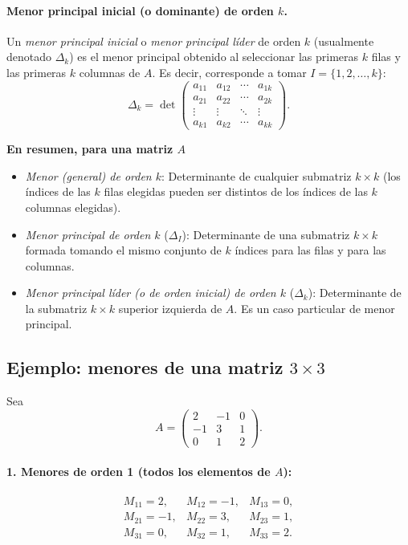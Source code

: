 \documentclass{article}
\begin{document}
\paragraph{Menor principal inicial (o dominante) de orden $k$.}
Un \emph{menor principal inicial} o  \emph{menor principal líder} de orden $k$ (usualmente denotado $\Delta_k$) es el menor principal obtenido al seleccionar las primeras $k$ filas y las primeras $k$ columnas de $A$. Es decir, corresponde a tomar $I = \{1, 2, \dots, k\}$:
\[
\Delta_k = \det\begin{pmatrix}
a_{11} & a_{12} & \cdots & a_{1k}\\
a_{21} & a_{22} & \cdots & a_{2k}\\
\vdots & \vdots & \ddots & \vdots\\
a_{k1} & a_{k2} & \cdots & a_{kk}
\end{pmatrix}.
\]

\medskip

\noindent\textbf{En resumen, para una matriz $A$}
\begin{itemize}
  \item \color{teal}\emph{Menor (general) de orden $k$}: Determinante de cualquier submatriz $k \times k$ (los índices de las $k$ filas elegidas pueden ser distintos de los índices de las $k$ columnas elegidas).
  \item \emph{Menor principal de orden $k$} ($\Delta_I$): Determinante de una submatriz $k \times k$ formada tomando el mismo conjunto de $k$ índices para las filas y para las columnas.
  \item \emph{Menor principal líder (o de orden inicial) de orden $k$} ($\Delta_k$): Determinante de la submatriz $k \times k$ superior izquierda de $A$. Es un caso particular de menor principal.
\end{itemize}

\subsection*{Ejemplo: menores de una matriz $3\times3$}

Sea
\[
A = \begin{pmatrix}
2 & -1 & 0\\[4pt]
-1 & 3 & 1\\[4pt]
0 & 1 & 2
\end{pmatrix}.
\]

\paragraph*{1. Menores de orden 1 (todos los elementos de \(A\)):}
\[
\begin{array}{ccc}
M_{11}=2, & M_{12}=-1, & M_{13}=0,\\[4pt]
M_{21}=-1,& M_{22}=3,  & M_{23}=1,\\[4pt]
M_{31}=0, & M_{32}=1,  & M_{33}=2.
\end{array}
\]
\end{document}
